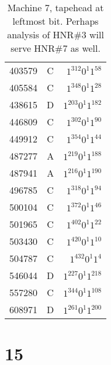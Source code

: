 \documentclass[12pt]{article}
\begin{document}
\begin{small}
\begin{table}[H]
\begin{Parallel}[c]{0.48\textwidth}{0.48\textwidth}
{{\begin{tabular}{rcr}
403579&C&$1^{312}0^{1}1^{58}$\\
405584&C&$1^{348}0^{1}1^{28}$\\
438615&D&$1^{203}0^{1}1^{182}$\\
446809&C&$1^{302}0^{1}1^{90}$\\
449912&C&$1^{354}0^{1}1^{44}$\\
487277&A&$1^{219}0^{1}1^{188}$\\
487941&A&$1^{216}0^{1}1^{190}$\\
496785&C&$1^{318}0^{1}1^{94}$\\
500104&C&$1^{372}0^{1}1^{46}$\\
501965&C&$1^{402}0^{1}1^{22}$\\
503430&C&$1^{420}0^{1}1^{10}$\\
504787&C&$1^{432}0^{1}1^{4}$\\
546044&D&$1^{227}0^{1}1^{218}$\\
557280&C&$1^{344}0^{1}1^{108}$\\
608971&D&$1^{261}0^{1}1^{200}$\\
\end{tabular}}}
\end{Parallel}
\caption{\label{tab:7}Machine 7, tapehead at leftmost bit. Perhaps analysis of HNR\#3 will serve HNR\#7 as well.}
\end{table}
\end{small}

\section*{15}
\end{document}
